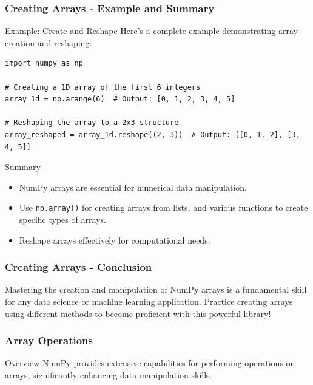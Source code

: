 \documentclass{beamer}
\begin{document}
\begin{frame}[fragile]
    \frametitle{Creating Arrays - Example and Summary}
    \begin{block}{Example: Create and Reshape}
        Here’s a complete example demonstrating array creation and reshaping:
        \begin{lstlisting}
import numpy as np
        
# Creating a 1D array of the first 6 integers
array_1d = np.arange(6)  # Output: [0, 1, 2, 3, 4, 5]
        
# Reshaping the array to a 2x3 structure
array_reshaped = array_1d.reshape((2, 3))  # Output: [[0, 1, 2], [3, 4, 5]]
        \end{lstlisting}
    \end{block}
    
    \begin{block}{Summary}
        \begin{itemize}
            \item NumPy arrays are essential for numerical data manipulation.
            \item Use \texttt{np.array()} for creating arrays from lists, and various functions to create specific types of arrays.
            \item Reshape arrays effectively for computational needs.
        \end{itemize}
    \end{block}
\end{frame}

\begin{frame}[fragile]
    \frametitle{Creating Arrays - Conclusion}
    Mastering the creation and manipulation of NumPy arrays is a fundamental skill for any data science or machine learning application. 
    Practice creating arrays using different methods to become proficient with this powerful library!
\end{frame}

\begin{frame}
    \frametitle{Array Operations}
    \begin{block}{Overview}
        NumPy provides extensive capabilities for performing operations on arrays, significantly enhancing data manipulation skills.
    \end{block}
\end{frame}
\end{document}

